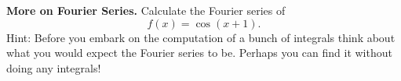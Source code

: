 \textbf{More on Fourier Series.} Calculate the Fourier series
of \[f(x) = \cos(x + 1).\] Hint: Before you embark on the computation
of a bunch of integrals think about what you would expect the Fourier
series to be. Perhaps you can find it without doing any integrals!
